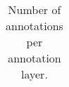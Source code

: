 \documentclass[preview=true]{standalone}
\begin{document}
\begin{table}[ht]
\begin{tabularx}{\linewidth}{XXl}
		\bottomrule
	\end{tabularx}
	\caption{Number of annotations per annotation layer.} %
	\label{tab:annotation}
\end{table}
\end{document}
